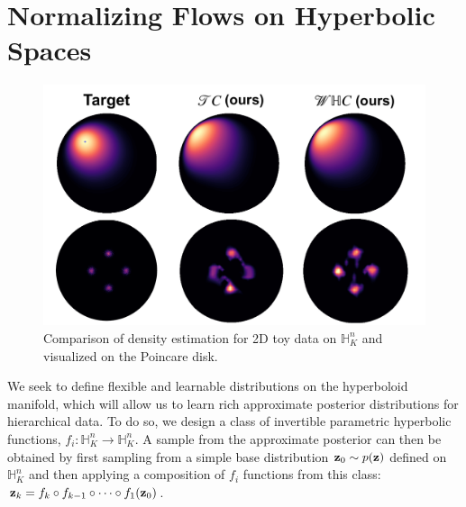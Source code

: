 \section{Normalizing Flows on Hyperbolic Spaces}
 \begin{figure}
     \centering
     \includegraphics[width=\linewidth]{hyperbolic_density_graphic.pdf}
     \vspace{-10pt}
     \caption{Comparison of density estimation for 2D toy data on $\mathbb{H}^n_K$ and visualized on the Poincare disk. }
     \vspace{-10pt}
     \label{fig:my_label}
 \end{figure}
We seek to define flexible and learnable distributions on the hyperboloid manifold, which will allow us to learn rich approximate posterior distributions for hierarchical data.
To do so, we design a class of invertible parametric hyperbolic functions, $f_i: \mathbb{H}^n_K \to \mathbb{H}^n_K$.
A sample from the approximate posterior can then be obtained by first sampling from a simple base distribution $\mathbf{z}_0 \sim p(\mathbf{z})$ defined on $\mathbb{H}^n_K$ and then applying a composition of $f_i$ functions from this class: $\mathbf{z}_k = f_k \circ f_{k-1} \circ \dots \circ f_1(\mathbf{z}_0)$.

